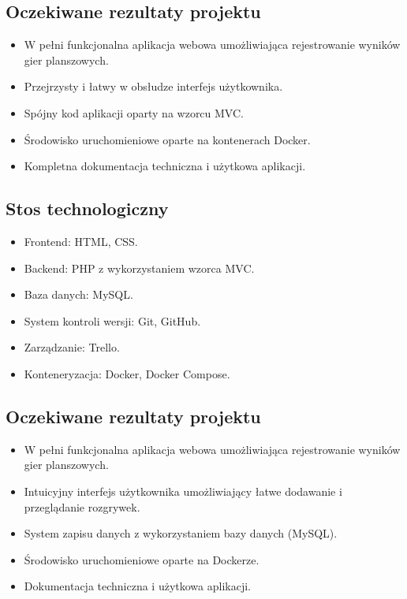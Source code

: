 \documentclass[12pt,a4paper]{article}
\begin{document}
\subsection{Oczekiwane rezultaty projektu}
\begin{itemize}
    \item W pełni funkcjonalna aplikacja webowa umożliwiająca rejestrowanie wyników gier planszowych.
    \item Przejrzysty i łatwy w obsłudze interfejs użytkownika.
    \item Spójny kod aplikacji oparty na wzorcu MVC.
    \item Środowisko uruchomieniowe oparte na kontenerach Docker.
    \item Kompletna dokumentacja techniczna i użytkowa aplikacji.
\end{itemize}

\subsection{Stos technologiczny}
\begin{itemize}
	\item Frontend: HTML, CSS.
	\item Backend: PHP z wykorzystaniem wzorca MVC.
	\item Baza danych: MySQL.
	\item System kontroli wersji: Git, GitHub.
	\item Zarządzanie: Trello.
	\item Konteneryzacja: Docker, Docker Compose.
\end{itemize}

\subsection{Oczekiwane rezultaty projektu}
\begin{itemize}
	\item W pełni funkcjonalna aplikacja webowa umożliwiająca rejestrowanie wyników gier planszowych.
	\item Intuicyjny interfejs użytkownika umożliwiający łatwe dodawanie i przeglądanie rozgrywek.
	\item System zapisu danych z wykorzystaniem bazy danych (MySQL).
	\item Środowisko uruchomieniowe oparte na Dockerze.
	\item Dokumentacja techniczna i użytkowa aplikacji.
\end{itemize}
\end{document}
